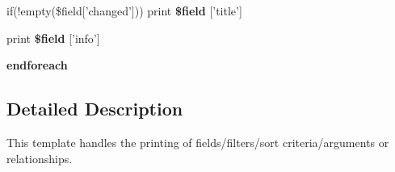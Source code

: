 \begin{DoxyCompactItemize}
\item 
\hypertarget{views-ui-edit-item_8tpl_8php_a27831f42dc27b33af9fc6fa4ed471b2a}{
if(!empty(\$field\mbox{[}'changed'\mbox{]})) print {\bfseries \$field} \mbox{[}'title'\mbox{]}}
\label{views-ui-edit-item_8tpl_8php_a27831f42dc27b33af9fc6fa4ed471b2a}

\item 
\hypertarget{views-ui-edit-item_8tpl_8php_a435dc5369f02964e90d0212ff8816c8e}{
print {\bfseries \$field} \mbox{[}'info'\mbox{]}}
\label{views-ui-edit-item_8tpl_8php_a435dc5369f02964e90d0212ff8816c8e}

\item 
\hypertarget{views-ui-edit-item_8tpl_8php_a672d9707ef91db026c210f98cc601123}{
{\bfseries endforeach}}
\label{views-ui-edit-item_8tpl_8php_a672d9707ef91db026c210f98cc601123}

\end{DoxyCompactItemize}


\subsection{Detailed Description}
This template handles the printing of fields/filters/sort criteria/arguments or relationships. 
